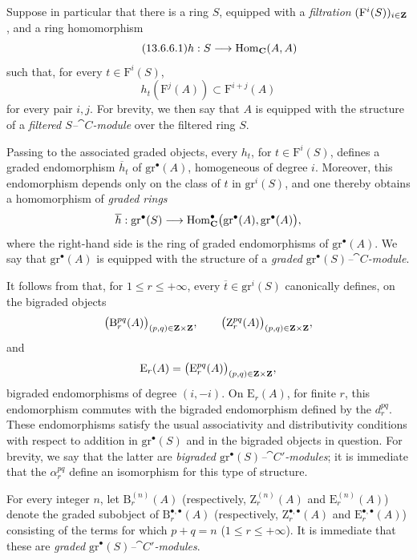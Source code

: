 \begin{env}[13.6.6]
\label{0.13.6.6}
Suppose in particular that there is a ring $S$, equipped with a
\emph{filtration} $(\mathrm{F}^i(S))_{i\in\mathbf{Z}}$, and a ring
homomorphism
\begin{equation}
\label{0.13.6.6.1}
\tag{13.6.6.1}
  h:S\longrightarrow\operatorname{Hom}_{\mathbf{C}}(A,A)
\end{equation}
such that, for every $t\in\mathrm{F}^i(S)$,
\[
  h_t(\mathrm{F}^j(A))
  \subset
  \mathrm{F}^{i+j}(A)
\]
for every pair $i,j$.
For brevity, we then say that $A$ is equipped with the structure of a
\emph{filtered $S$--$\cat{C}$-module} over the filtered ring $S$.

Passing to the associated graded objects, every $h_t$, for
$t\in\mathrm{F}^i(S)$, defines a graded endomorphism
$\overline{h}_t$ of $\mathrm{gr}^\bullet(A)$, homogeneous of degree
$i$.
Moreover, this endomorphism depends only on the class of $t$ in
$\mathrm{gr}^i(S)$, and one thereby obtains a homomorphism of
\emph{graded rings}
\[
  \overline{h}:
  \mathrm{gr}^\bullet(S)
  \longrightarrow
  \operatorname{Hom}_{\mathbf{C}}^\bullet
  \bigl(\mathrm{gr}^\bullet(A),\mathrm{gr}^\bullet(A)\bigr),
\]
where the right-hand side is the ring of graded endomorphisms of
$\mathrm{gr}^\bullet(A)$.
We say that $\mathrm{gr}^\bullet(A)$ is equipped with the structure
of a \emph{graded $\mathrm{gr}^\bullet(S)$--$\cat{C}$-module}.

It follows from  that, for
$1\leq r\leq+\infty$, every
$\overline{t}\in\mathrm{gr}^i(S)$ canonically defines, on the
bigraded objects
\[
  \bigl(\mathrm{B}_r^{pq}(A)\bigr)_{(p,q)\in\mathbf{Z}\times\mathbf{Z}},
  \qquad
  \bigl(\mathrm{Z}_r^{pq}(A)\bigr)_{(p,q)\in\mathbf{Z}\times\mathbf{Z}},
\]
and
\[
  \mathrm{E}_r(A)
  =
  \bigl(\mathrm{E}_r^{pq}(A)\bigr)_{(p,q)\in\mathbf{Z}\times\mathbf{Z}},
\]
bigraded endomorphisms of degree $(i,-i)$.
On $\mathrm{E}_r(A)$, for finite $r$, this endomorphism commutes with
the bigraded endomorphism defined by the $d_r^{pq}$.
These endomorphisms satisfy the usual associativity and
distributivity conditions with respect to addition in
$\mathrm{gr}^\bullet(S)$ and in the bigraded objects in question.
For brevity, we say that the latter are
\emph{bigraded $\mathrm{gr}^\bullet(S)$--$\cat{C}'$-modules};
it is immediate that the $\alpha_r^{pq}$ define an isomorphism for
this type of structure.

For every integer $n$, let $\mathrm{B}_r^{(n)}(A)$
(respectively, $\mathrm{Z}_r^{(n)}(A)$ and
$\mathrm{E}_r^{(n)}(A)$) denote the graded subobject of
$\mathrm{B}_r^{\bullet,\bullet}(A)$
(respectively, $\mathrm{Z}_r^{\bullet,\bullet}(A)$ and
$\mathrm{E}_r^{\bullet,\bullet}(A)$) consisting of the terms for
which $p+q=n$ ($1\leq r\leq+\infty$).
It is immediate that these are
\emph{graded $\mathrm{gr}^\bullet(S)$--$\cat{C}'$-modules}.


\end{env}
